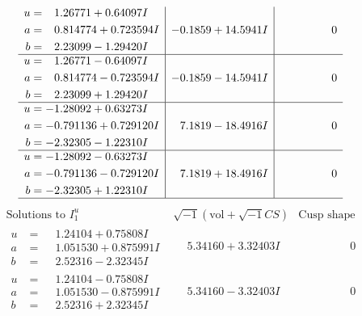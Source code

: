\documentclass[1p]{elsarticle_modified}
\theoremstyle{definition}
\newcommand{\I}{\sqrt{-1}}
\begin{document}
$$\begin{array}{c|c|c}
\begin{aligned}
u &= \phantom{-}1.26771 + 0.64097 I \\
a &= \phantom{-}0.814774 + 0.723594 I \\
b &= \phantom{-}2.23099 - 1.29420 I\end{aligned}
 & -0.1859 + 14.5941 I & \phantom{-0.000000 } 0 \\ \hline\begin{aligned}
u &= \phantom{-}1.26771 - 0.64097 I \\
a &= \phantom{-}0.814774 - 0.723594 I \\
b &= \phantom{-}2.23099 + 1.29420 I\end{aligned}
 & -0.1859 - 14.5941 I & \phantom{-0.000000 } 0 \\ \hline\begin{aligned}
u &= -1.28092 + 0.63273 I \\
a &= -0.791136 + 0.729120 I \\
b &= -2.32305 - 1.22310 I\end{aligned}
 & \phantom{-}7.1819 - 18.4916 I & \phantom{-0.000000 } 0 \\ \hline\begin{aligned}
u &= -1.28092 - 0.63273 I \\
a &= -0.791136 - 0.729120 I \\
b &= -2.32305 + 1.22310 I\end{aligned}
 & \phantom{-}7.1819 + 18.4916 I & \phantom{-0.000000 } 0\\
 \hline 
 \end{array}$$\newpage$$\begin{array}{c|c|c}  
\text{Solutions to }I^u_{1}& \I (\text{vol} + \sqrt{-1}CS) & \text{Cusp shape}\\
 \hline 
\begin{aligned}
u &= \phantom{-}1.24104 + 0.75808 I \\
a &= \phantom{-}1.051530 + 0.875991 I \\
b &= \phantom{-}2.52316 - 2.32345 I\end{aligned}
 & \phantom{-}5.34160 + 3.32403 I & \phantom{-0.000000 } 0 \\ \hline\begin{aligned}
u &= \phantom{-}1.24104 - 0.75808 I \\
a &= \phantom{-}1.051530 - 0.875991 I \\
b &= \phantom{-}2.52316 + 2.32345 I\end{aligned}
 & \phantom{-}5.34160 - 3.32403 I & \phantom{-0.000000 } 0 \\ \hline\begin{aligned}

\end{aligned}
\end{array}$$
\end{document}
